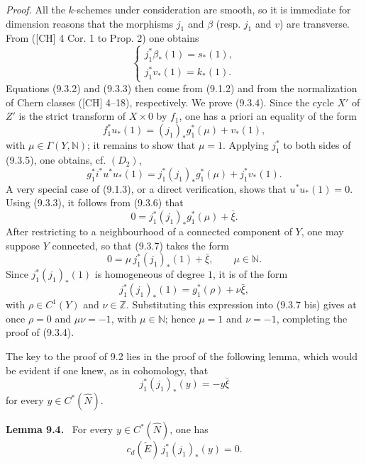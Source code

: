 \documentclass[11pt]{article}
\newenvironment{statement}[1]{\par\medskip\noindent\textbf{#1.}\ }{\par\medskip}
\begin{document}
\emph{Proof.} All the $k$-schemes under consideration are smooth, so it is immediate for dimension reasons that the morphisms $j_1$ and $\beta$ (resp. $j_1$ and $v$) are transverse. From ([CH] 4 Cor. 1 to Prop. 2) one obtains
\[
\begin{cases}
j_1^*\beta_*(1)=s_*(1),\\
j_1^*v_*(1)=k_*(1).
\end{cases}
\]
Equations (9.3.2) and (9.3.3) then come from (9.1.2) and from the normalization of Chern classes ([CH] 4--18), respectively. We prove (9.3.4). Since the cycle $X'$ of $Z'$ is the strict transform of $X\times0$ by $f_1$, one has a priori an equality of the form
\[
f_1^*u_*(1)=(j_1)_*g_1^*(\mu)+v_*(1),
\tag{9.3.5}
\]
with $\mu\in\Gamma(Y,\mathbb N)$; it remains to show that $\mu=1$. Applying $j_1^*$ to both sides of (9.3.5), one obtains, cf. $(D_2)$,
\[
g_1^*i^*u^*u_*(1)=j_1^*(j_1)_*g_1^*(\mu)+j_1^*v_*(1).
\tag{9.3.6}
\]
A very special case of (9.1.3), or a direct verification, shows that $u^*u_*(1)=0$. Using (9.3.3), it follows from (9.3.6) that
\[
0=j_1^*(j_1)_*g_1^*(\mu)+\bar\xi.
\tag{9.3.7}
\]
After restricting to a neighbourhood of a connected component of $Y$, one may suppose $Y$ connected, so that (9.3.7) takes the form
\[
0=\mu\,j_1^*(j_1)_*(1)+\bar\xi,\qquad \mu\in\mathbb N.
\tag{9.3.7 bis}
\]
Since $j_1^*(j_1)_*(1)$ is homogeneous of degree $1$, it is of the form
\[
j_1^*(j_1)_*(1)=g_1^*(\rho)+\nu\bar\xi,
\]
with $\rho\in C^1(Y)$ and $\nu\in\mathbb Z$. Substituting this expression into (9.3.7 bis) gives at once $\rho=0$ and $\mu\nu=-1$, with $\mu\in\mathbb N$; hence $\mu=1$ and $\nu=-1$, completing the proof of (9.3.4).

The key to the proof of 9.2 lies in the proof of the following lemma, which would be evident if one knew, as in cohomology, that
\[
j_1^*(j_1)_*(y)=-y\bar\xi
\]
for every $y\in C^*(\widehat N)$.

\begin{statement}{Lemma 9.4}
For every $y\in C^*(\widehat N)$, one has
\[
c_d(\check E)\,j_1^*(j_1)_*(y)=0.
\]
\end{statement}
\end{document}
